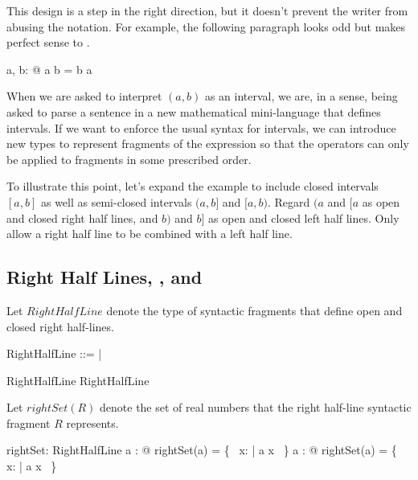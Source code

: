 \documentclass[11pt, oneside]{article}
\begin{document}
This design is a step in the right direction, but it doesn't prevent the writer from abusing the notation.
For example, the following paragraph looks odd but makes perfect sense to \fuzz.

\begin{zed}
	\forall a, b: \R @ \lowerBound a \intersect b \upperBound = b \upperBound \intersect \lowerBound a 
\end{zed}

When we are asked to interpret $(a,b)$ as an interval, we are, in a sense, being asked to parse a sentence
in a new mathematical mini-language that defines intervals.
If we want to enforce the usual syntax for intervals,
we can introduce new types to represent fragments of the expression so that the operators can only be applied to
fragments in some prescribed order.

To illustrate this point, let's expand the example to include closed intervals $[a,b]$ as well as semi-closed intervals
$(a,b]$ and $[a,b)$.
Regard $(a$ and $[a$ as open and closed right half lines, and $b)$ and $b]$ as open and closed left half lines.
Only allow a right half line to be combined with a left half line.

\subsection{Right Half Lines, , and }

Let $RightHalfLine$ denote the type of syntactic fragments that define open and closed right half-lines.

\begin{zed}
	RightHalfLine ::= \openLowerBound \ldata \R \rdata | \closedLowerBound \ldata \R \rdata
\end{zed}

\begin{example}

\begin{zed}
	\openLowerBound \zeroR \in RightHalfLine
\also
	\closedLowerBound \oneR \in RightHalfLine
\end{zed}

\end{example}

Let $rightSet(R)$ denote the set of real numbers that the right half-line syntactic fragment $R$ represents.

\begin{axdef}
	rightSet: RightHalfLine \fun \power \R
\where
	\forall a : \R @ rightSet(\openLowerBound a) = \{~ x: \R | a \ltR x ~\}
\also
	\forall a : \R @ rightSet(\closedLowerBound a) = \{~ x: \R | a \leR x ~\}
\end{axdef}
\end{document}
